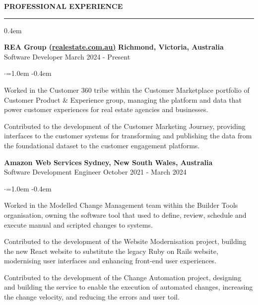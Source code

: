 \documentclass{cv}
\begin{document}
\medskip

{} \textbf{PROFESSIONAL EXPERIENCE}
\sectionlineskip
\hrule
\begin{list}{}{\setlength{\leftmargin}{0em}}
\itemsep 0.4em
\item[] 
    \textbf{REA Group (\href{https://realestate.com.au/}{realestate.com.au)}} \hfill \textbf{Richmond, Victoria, Australia}%
    \\
    {Software Developer} \hfill {March 2024 - Present}%
    \begin{list}{$\cdot$}{\leftmargin=1.0em}
    \itemsep -0.4em \vspace{-0.4em}
        \item Worked in the Customer 360 tribe within the Customer Marketplace portfolio of Customer Product \& Experience group, managing the platform and data that power customer experiences for real estate agencies and businesses.
        \item Contributed to the development of the Customer Marketing Journey, providing interfaces to the customer systems for transforming and publishing the data from the foundational dataset to the customer engagement platforms.
    \end{list}
\item[] 
    \textbf{Amazon Web Services} \hfill \textbf{Sydney, New South Wales, Australia}%
    \\ 
    {Software Development Engineer} \hfill {October 2021 - March 2024}%
    \begin{list}{$\cdot$}{\leftmargin=1.0em}
    \itemsep -0.4em \vspace{-0.4em}
        \item Worked in the Modelled Change Management team within the Builder Tools organisation, owning the software tool that used to define, review, schedule and execute manual and scripted changes to systems.
        \item Contributed to the development of the Website Modernisation project, building the new React website to substitute the legacy Ruby on Rails website, modernising user interfaces and enhancing front-end user experiences.
        \item Contributed to the development of the Change Automation project, designing and building the service to enable the execution of automated changes, increasing the change velocity, and reducing the errors and user toil.

\end{list}
\end{list}
\end{document}
